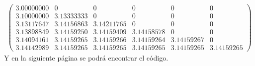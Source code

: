 \begin{homeworkProblem}
\begin{enumerate}
\begin{solucion}
\begin{align*}
\begin{pmatrix}
            3.00000000 & 0 & 0 & 0 & 0 & 0\\
            3.10000000 & 3.13333333 & 0 & 0 & 0 & 0\\
            3.13117647 & 3.14156863 & 3.14211765 & 0 & 0 & 0\\
            3.13898849 & 3.14159250 & 3.14159409 & 3.14158578 & 0 & 0\\
            3.14094161 & 3.14159265 & 3.14159266 & 3.14159264 & 3.14159267 & 0\\
          3.14142989 & 3.14159265 & 3.14159265 & 3.14159265 & 3.14159265 & 3.14159265
          \end{pmatrix}
        \end{align*}
        Y en la siguiente página se podrá encontrar el código.
        \newpage
        
      \end{solucion}
  \end{enumerate}
\end{homeworkProblem}
